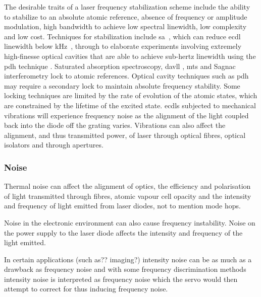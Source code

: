 The desirable traits of a laser frequency stabilization scheme include the ability to stabilize to an absolute atomic reference, absence of frequency or amplitude modulation, high bandwidth to achieve low spectral linewidth, low complexity and low cost.
Techniques for stabilization include \gls*{sa}~\cite{maguire_theoretical_2006, haroche_theory_1972, preston_doppler-free_1996}, which can reduce \gls*{ecdl} linewidth below \unit[100]{kHz}~\cite{cuneo_optically_1994, saliba_linewidths_2009}, through to elaborate experiments involving extremely high-finesse optical cavities that are able to achieve sub-hertz linewidth using the \gls*{pdh} technique \cite{ludlow_compact_2007}.
Saturated absorption spectroscopy, \gls*{davll} \cite{corwin_frequency-stabilized_1998,millett-sikking_davll_2007}, \gls*{mts} \cite{shirley_modulation_1982, mccarron_modulation_2008,xiang-hui_ultra-stable_2009} and Sagnac interferometry \cite{robins_Interferometric_2002,jundt_non-linear_2003} lock to atomic references.
Optical cavity techniques such as \gls*{pdh} \cite{drever_laser_1983} may require a secondary lock to maintain absolute frequency stability.
Some locking techniques are limited by the rate of evolution of the atomic states, which are constrained by the lifetime of the excited state.
\Glspl{ecdl} subjected to mechanical vibrations will experience frequency noise as the alignment of the light coupled back into the diode off the grating varies.
Vibrations can also affect the alignment, and thus transmitted power, of laser through optical fibres, optical isolators and through apertures.

\subsubsection{Noise}
Thermal noise can affect the alignment of optics, the efficiency and polarisation of light transmitted through fibres, atomic vapour cell opacity and the intensity and frequency of light emitted from laser diodes, not to mention mode hops.

Noise in the electronic environment can also cause frequency instability. Noise on the power supply to the laser diode affects the intensity and frequency of the light emitted.

In certain applications {\color{red}(such as?? imaging?)} intensity noise can be as much as a drawback as frequency noise and with some frequency discrimination methods intensity noise is interpreted as frequency noise which the servo would then attempt to correct for thus inducing frequency noise.

